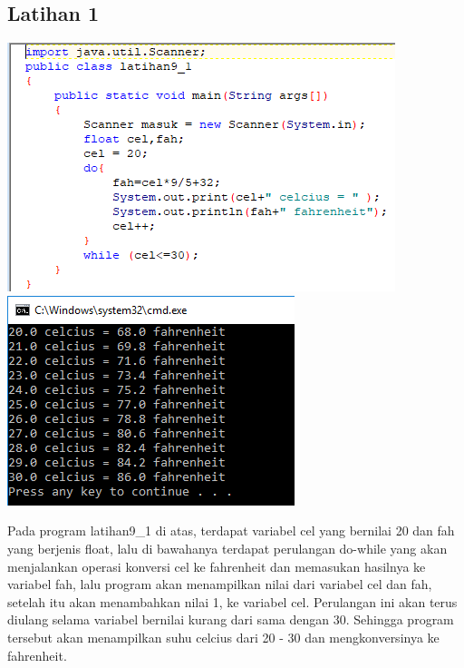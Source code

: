 \documentclass[a4paper,12pt]{article}
\begin{document}
\subsection{Latihan 1}
\begin{center}
	\includegraphics[scale=1]{Capture6}
	\includegraphics[scale=1]{Capture6_2}
\end{center}
Pada program latihan9\_1 di atas, terdapat variabel cel yang bernilai 20 dan fah yang berjenis float, lalu di bawahanya terdapat perulangan do-while yang akan menjalankan operasi konversi cel ke fahrenheit dan memasukan hasilnya ke variabel fah, lalu program akan menampilkan nilai dari variabel cel dan fah, setelah itu akan menambahkan nilai 1, ke variabel cel. Perulangan ini akan terus diulang selama variabel bernilai kurang dari sama dengan 30. Sehingga program tersebut akan menampilkan suhu celcius dari 20 - 30 dan mengkonversinya ke fahrenheit.
\end{document}
